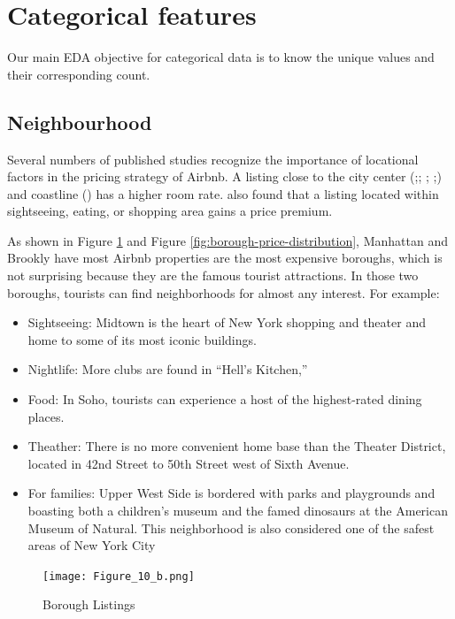\section{Categorical features}
\label{sec:categorical_features}

Our main EDA objective for categorical data is to know the unique values and
their corresponding count.

\subsection{Neighbourhood}

Several numbers of published studies recognize the importance of locational
factors in the pricing strategy of Airbnb.  A listing close to the city center
(\cite{gibbs2018use};\cite{li2016pros}; \cite{wang2017price};
\cite{zhang2017key};\cite{gibbs2018use}) and coastline (\cite{perez2018and}) has
a higher room rate.  \cite{perez2018and} also found that a listing located
within sightseeing, eating, or shopping area gains a price premium.

As shown in Figure \ref{fig:borough-number-of-listing} and Figure
\ref{fig:borough-price-distribution}, Manhattan and Brookly have most Airbnb
properties are the most expensive boroughs, which is not surprising because they
are the famous tourist attractions.  In those two boroughs, tourists can find
neighborhoods for almost any interest. For example:

\begin{itemize}
  \item Sightseeing: Midtown is the heart of New York shopping and theater and
    home to some of its most iconic buildings.
  \item Nightlife:  More clubs are found in “Hell’s Kitchen,”
  \item Food: In Soho, tourists can experience a host of the highest-rated
    dining places.
  \item Theather: There is no more convenient home base than
    the Theater District,  located in 42nd Street to 50th Street west of Sixth
    Avenue.
  \item For families: Upper West Side is bordered with parks and playgrounds and
  boasting both a children’s museum and the famed dinosaurs at the American Museum
  of Natural. This neighborhood is also considered one of the safest areas of New
  York City
\end{itemize}


\begin{figure}[H] \centering
    \texttt{[image: Figure\_10\_b.png]}
    \caption{Borough Listings}
    \label{fig:borough-number-of-listing}
\end{figure}

